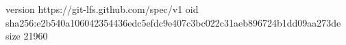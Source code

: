 version https://git-lfs.github.com/spec/v1
oid sha256:e2b540a106042354436edc5efdc9e407c3bc022c31aeb896724b1dd09aa273de
size 21960

